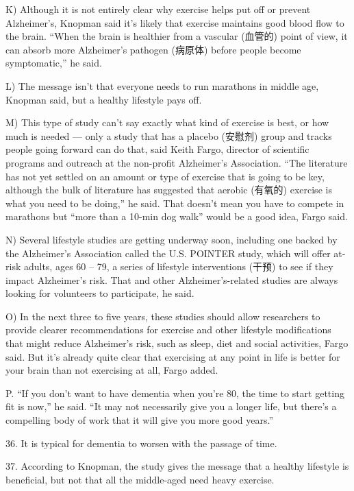 \documentclass[UTF8,11pt]{ctexart}
\begin{document}
K) Although it is not entirely clear why exercise helps put off or prevent Alzheimer’s, Knopman said it’s likely that exercise maintains good blood flow to the brain. “When the brain is healthier from a vascular (血管的) point of view, it can absorb more Alzheimer’s pathogen (病原体) before people become symptomatic,” he said.


L) The message isn’t that everyone needs to run marathons in middle age, Knopman said, but a healthy lifestyle pays off.


M) This type of study can’t say exactly what kind of exercise is best, or how much is needed — only a study that has a placebo (安慰剂) group and tracks people going forward can do that, said Keith Fargo, director of scientific programs and outreach at the non-profit Alzheimer’s Association. “The literature has not yet settled on an amount or type of exercise that is going to be key, although the bulk of literature has suggested that aerobic (有氧的) exercise is what you need to be doing,” he said. That doesn’t mean you have to compete in marathons but “more than a 10-min dog walk” would be a good idea, Fargo said.


N) Several lifestyle studies are getting underway soon, including one backed by the Alzheimer’s Association called the U.S. POINTER study, which will offer at-risk adults, ages 60 – 79, a series of lifestyle interventions (干预) to see if they impact Alzheimer’s risk. That and other Alzheimer’s-related studies are always looking for volunteers to participate, he said.


O) In the next three to five years, these studies should allow researchers to provide clearer recommendations for exercise and other lifestyle modifications that might reduce Alzheimer’s risk, such as sleep, diet and social activities, Fargo said. But it’s already quite clear that exercising at any point in life is better for your brain than not exercising at all, Fargo added.


P. “If you don’t want to have dementia when you’re 80, the time to start getting fit is now,” he said. “It may not necessarily give you a longer life, but there’s a compelling body of work that it will give you more good years.”


36. It is typical for dementia to worsen with the passage of time.


37. According to Knopman, the study gives the message that a healthy lifestyle is beneficial, but not that all the middle-aged need heavy exercise.
\end{document}
